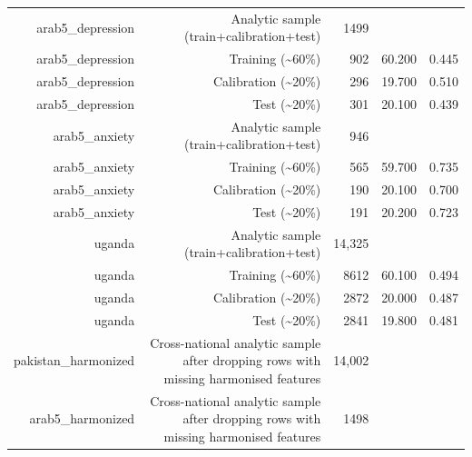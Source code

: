 \documentclass[10pt]{article}
\begin{document}
\begin{longtable}{rrrrr}
arab5\_depression & Analytic sample (train+calibration+test) & 1499 &  &  \\
arab5\_depression & Training (\textasciitilde{}60\%) & 902 & 60.200 & 0.445 \\
arab5\_depression & Calibration (\textasciitilde{}20\%) & 296 & 19.700 & 0.510 \\
arab5\_depression & Test (\textasciitilde{}20\%) & 301 & 20.100 & 0.439 \\
arab5\_anxiety & Analytic sample (train+calibration+test) & 946 &  &  \\
arab5\_anxiety & Training (\textasciitilde{}60\%) & 565 & 59.700 & 0.735 \\
arab5\_anxiety & Calibration (\textasciitilde{}20\%) & 190 & 20.100 & 0.700 \\
arab5\_anxiety & Test (\textasciitilde{}20\%) & 191 & 20.200 & 0.723 \\
uganda & Analytic sample (train+calibration+test) & 14{,}325 &  &  \\
uganda & Training (\textasciitilde{}60\%) & 8612 & 60.100 & 0.494 \\
uganda & Calibration (\textasciitilde{}20\%) & 2872 & 20.000 & 0.487 \\
uganda & Test (\textasciitilde{}20\%) & 2841 & 19.800 & 0.481 \\
pakistan\_harmonized & Cross-national analytic sample after dropping rows with missing harmonised features & 14{,}002 &  &  \\
arab5\_harmonized & Cross-national analytic sample after dropping rows with missing harmonised features & 1498 &  &  \\
\bottomrule
\end{longtable}
\normalsize
\end{document}
